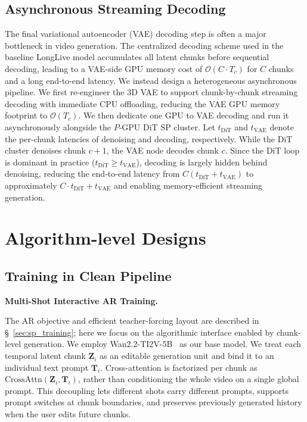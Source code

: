 \documentclass{llmxive}
\begin{document}
\subsection{Asynchronous Streaming Decoding}
The final variational autoencoder (VAE) decoding step is often a major bottleneck in video generation. The centralized decoding scheme used in the baseline LongLive model accumulates all latent chunks before sequential decoding, leading to a VAE-side GPU memory cost of $\mathcal{O}(C \cdot T_c)$ for $C$ chunks and a long end-to-end latency.
We instead design a heterogeneous asynchronous pipeline. We first re-engineer the 3D VAE to support chunk-by-chunk streaming decoding with immediate CPU offloading, reducing the VAE GPU memory footprint to $\mathcal{O}(T_c)$. We then dedicate one GPU to VAE decoding and run it asynchronously alongside the $P$-GPU DiT SP cluster. Let $t_{\text{DiT}}$ and $t_{\text{VAE}}$ denote the per-chunk latencies of denoising and decoding, respectively. 
While the DiT cluster denoises chunk $c+1$, the VAE node decodes chunk $c$. Since the DiT loop is dominant in practice ($t_{\text{DiT}} \ge t_{\text{VAE}}$), decoding is largely hidden behind denoising, reducing the end-to-end latency from $C(t_{\text{DiT}} + t_{\text{VAE}})$ to approximately $C \cdot t_{\text{DiT}} + t_{\text{VAE}}$ and enabling memory-efficient streaming generation.

\section{Algorithm-level Designs}
\subsection{Training in Clean Pipeline}
\textbf{Multi-Shot Interactive AR Training.}\label{sec:interactive_training}$\;$

The AR objective and efficient teacher-forcing layout are described in \S~\ref{sec:sp_training}; here we focus on the algorithmic interface enabled by chunk-level generation. We employ Wan2.2-TI2V-5B~\cite{wan} as our base model.
We treat each temporal latent chunk $\mathbf{Z}_i$ as an editable generation unit and bind it to an individual text prompt $\mathbf{T}_i$.
Cross-attention is factorized per chunk as $\text{CrossAttn}(\mathbf{Z}_i, \mathbf{T}_i)$, rather than conditioning the whole video on a single global prompt.
This decoupling lets different shots carry different prompts, supports prompt switches at chunk boundaries, and preserves previously generated history when the user edits future chunks.
\end{document}
